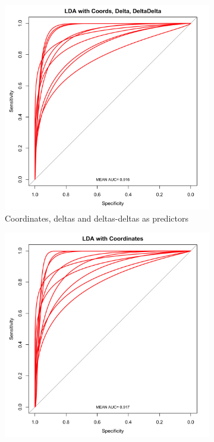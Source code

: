 \documentclass{article}
\begin{document}
\begin{itemize}
\begin{figure}[h]
\begin{subfigure}{0.3\textwidth}
\includegraphics[width=\textwidth]{ROC_LDA-FULL.png}
\caption{Coordinates, deltas and deltas-deltas as predictors}
\end{subfigure}
\begin{subfigure}{0.3\textwidth}
\includegraphics[width=\textwidth]{ROC_LDA-Coords.png}

\end{subfigure}
\end{figure}
\end{itemize}
\end{document}
